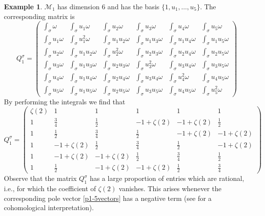 \documentclass[a4paper,10pt]{amsart}
\theoremstyle{definition}
\newtheorem{example}[thm]{Example}
\theoremstyle{remark}
\numberwithin{equation}{section}
\newcommand{\0}{\color{blue}{\mathsf{0}}}
\begin{document}
\begin{example}
$\mathcal{M}_1$ has dimension $6$ and has the basis $\{ 1, u_1,\ldots, u_5\}$. 
The corresponding matrix is \[Q^{\sigma}_{1} = \begin{pmatrix}  \int_{\sigma} \omega &     \int_{\sigma} u_1\omega &  \int_{\sigma} u_2\omega &  \int_{\sigma}u_3 \omega & \int_{\sigma} u_4\omega
& \int_{\sigma} u_5\omega\\[6pt]
\int_{\sigma} u_1 \omega &     \int_{\sigma} u^2_1\omega &  \int_{\sigma} u_1u_2\omega &  \int_{\sigma}u_1u_3 \omega & \int_{\sigma} u_1u_4\omega
& \int_{\sigma} u_1u_5\omega\\[6pt]
\int_{\sigma}  u_2 \omega &     \int_{\sigma} u_1u_2\omega &  \int_{\sigma} u^2_2\omega &  \int_{\sigma}u_2u_3 \omega & \int_{\sigma}u_2 u_4\omega
& \int_{\sigma} u_2u_5\omega\\[6pt]
\int_{\sigma} u_3 \omega &     \int_{\sigma} u_1u_3\omega &  \int_{\sigma} u_2u_3\omega &  \int_{\sigma}u^2_3 \omega & \int_{\sigma} u_3u_4\omega
& \int_{\sigma} u_3u_5\omega\\[6pt]
\int_{\sigma}  u_4\omega &     \int_{\sigma} u_1u_4\omega &  \int_{\sigma} u_2u_4\omega &  \int_{\sigma}u_3u_4 \omega & \int_{\sigma} u^2_4\omega
& \int_{\sigma} u_4u_5\omega\\[6pt]
\int_{\sigma}  u_5\omega &     \int_{\sigma} u_1u_5\omega &  \int_{\sigma} u_2u_5\omega &  \int_{\sigma}u_3u_5 \omega & \int_{\sigma} u_4u_5\omega
& \int_{\sigma} u^2_5\omega 
\end{pmatrix}\]
By performing the integrals we find that
\[  Q^{\sigma}_{1} = \begin{pmatrix} \zeta(2)  &    1 & 1  &  1  &1  & 1 \\[6pt]
1  &     \frac{3}{4} & \frac{1}{2}  &  -1+ \zeta(2)   &  -1+ \zeta(2)
& \frac{1}{2}  \\[6pt]
1 &    \frac{1}{2} &  \frac{3}{4} & \frac{1}{2} &   -1+ \zeta(2)
&  -1+ \zeta(2) \\[6pt]
1 &      -1+ \zeta(2)& \frac{1}{2} & \frac{3}{4} &\frac{1}{2}
&  -1+ \zeta(2)  \\[6pt]
1 &      -1+ \zeta(2) &    -1+ \zeta(2) &  \frac{1}{2} & \frac{3}{4}
& \frac{1}{2}  \\[6pt]
1 &  \frac{1}{2}&   -1+ \zeta(2) &   -1+ \zeta(2) & \frac{1}{2}
& \frac{3}{4} 
\end{pmatrix}\]
 Observe that the matrix $Q^{\sigma}_1$ has a large proportion of entries which are rational, i.e., for which the coefficient of $\zeta(2)$ vanishes. This arises 
whenever the corresponding pole vector \eqref{p1-5vectors} has a negative term (see \cite{DinnerParties} for a cohomological  interpretation). 

\end{example}
\end{document}
